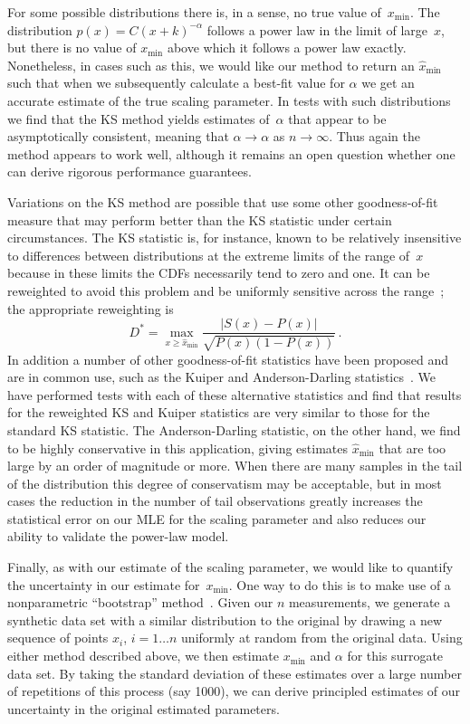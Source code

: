 \documentclass[final]{siamltex}
\newcommand{\xmin}{\ensuremath{x_{\min}}}
\newcommand{\punctspace}{\,}
\begin{document}
For some possible distributions there is, in a sense, no true value
of~$\xmin$.  The distribution $p(x) = C(x+k)^{-\alpha}$ follows a power law
in the limit of large~$x$, but there is no value of $\xmin$ above which it
follows a power law exactly.  Nonetheless, in cases such as this, we would
like our method to return an $\hat{x}_{\min}$ such that when we
subsequently calculate a best-fit value for $\alpha$ we get an accurate
estimate of the true scaling parameter.  In tests with such distributions
we find that the KS method yields estimates of~$\alpha$ that appear to be
asymptotically consistent, meaning that $\hat{\alpha}\to\alpha$ as
$n\to\infty$.  Thus again the method appears to work well, although it
remains an open question whether one can derive rigorous performance
guarantees.

Variations on the KS method are possible that use some other
goodness-of-fit measure that may perform better than the KS statistic under
certain circumstances.  The KS statistic is, for instance, known to be
relatively insensitive to differences between distributions at the extreme
limits of the range of~$x$ because in these limits the CDFs necessarily
tend to zero and one.  It can be reweighted to avoid this problem and be
uniformly sensitive across the range~\cite{Numerical-Recipes-in-C}; the
appropriate reweighting is
\begin{equation}
\label{eq:stabilized}
D^* = \max_{x\ge\hat{x}_{\min}}
     \frac{\left| S(x) - P(x) \right|}{\sqrt{P(x)(1-P(x))}} \punctspace .
\end{equation}
In addition a number of other goodness-of-fit statistics have been proposed
and are in common use, such as the Kuiper and Anderson-Darling
statistics~\cite{DAgostino-and-Stephens-on-GoF}.  We have performed tests
with each of these alternative statistics and find that results for the
reweighted KS and Kuiper statistics are very similar to those for the
standard KS statistic.  The Anderson-Darling statistic, on the other hand,
we find to be highly conservative in this application, giving estimates
$\hat{x}_{\min}$ that are too large by an order of magnitude or more.  When
there are many samples in the tail of the distribution this degree of
conservatism may be acceptable, but in most cases the reduction in the
number of tail observations greatly increases the statistical error on our
MLE for the scaling parameter and also reduces our ability to validate the
power-law model.

Finally, as with our estimate of the scaling parameter, we would like to
quantify the uncertainty in our estimate for~$\xmin$.  One way to do this
is to make use of a nonparametric ``bootstrap''
method~\cite{Efron-Tibshirani-bootstrap}.  Given our $n$ measurements, we
generate a synthetic data set with a similar distribution to the original
by drawing a new sequence of points $x_{i}$, $i=1\dots n$ uniformly at
random from the original data.  Using either method described above, we
then estimate $\xmin$ and $\alpha$ for this surrogate data set.  By taking
the standard deviation of these estimates over a large number of
repetitions of this process (say 1000), we can derive principled estimates
of our uncertainty in the original estimated parameters.
\end{document}

